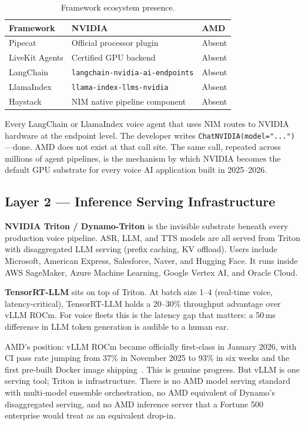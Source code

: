 \documentclass[blind]{gtac}
\begin{document}
\begin{table}[H]
\centering
\caption{Framework ecosystem presence.}
\label{tab:framework}
\tiny
\begin{tabular}{@{}lll@{}}
\toprule
Framework & NVIDIA & AMD \\
\midrule
Pipecat & Official processor plugin & Absent \\
LiveKit Agents & Certified GPU backend & Absent \\
LangChain & \texttt{langchain-nvidia-ai-endpoints} & Absent \\
LlamaIndex & \texttt{llama-index-llms-nvidia} & Absent \\
Haystack & NIM native pipeline component & Absent \\
\bottomrule
\end{tabular}
\end{table}

Every LangChain or LlamaIndex voice agent that uses NIM routes to NVIDIA hardware at the endpoint level. The developer writes \texttt{ChatNVIDIA(model="{...}")}---done. AMD does not exist at that call site. The same call, repeated across millions of agent pipelines, is the mechanism by which NVIDIA becomes the default GPU substrate for every voice AI application built in 2025--2026.

\subsection{Layer 2 --- Inference Serving Infrastructure}

\textbf{NVIDIA Triton / Dynamo-Triton} is the invisible substrate beneath every production voice pipeline. ASR, LLM, and TTS models are all served from Triton with disaggregated LLM serving (prefix caching, KV offload). Users include Microsoft, American Express, Salesforce, Naver, and Hugging Face. It runs inside AWS SageMaker, Azure Machine Learning, Google Vertex AI, and Oracle Cloud.

\textbf{TensorRT-LLM} sits on top of Triton. At batch size 1--4 (real-time voice, latency-critical), TensorRT-LLM holds a 20--30\% throughput advantage over vLLM ROCm. For voice fleets this is the latency gap that matters: a 50\,ms difference in LLM token generation is audible to a human ear.

AMD's position: vLLM ROCm became officially first-class in January 2026, with CI pass rate jumping from 37\% in November 2025 to 93\% in six weeks and the first pre-built Docker image shipping~\cite{vllm_rocm}. This is genuine progress. But vLLM is one serving tool; Triton is infrastructure. There is no AMD model serving standard with multi-model ensemble orchestration, no AMD equivalent of Dynamo's disaggregated serving, and no AMD inference server that a Fortune 500 enterprise would treat as an equivalent drop-in.
\end{document}
